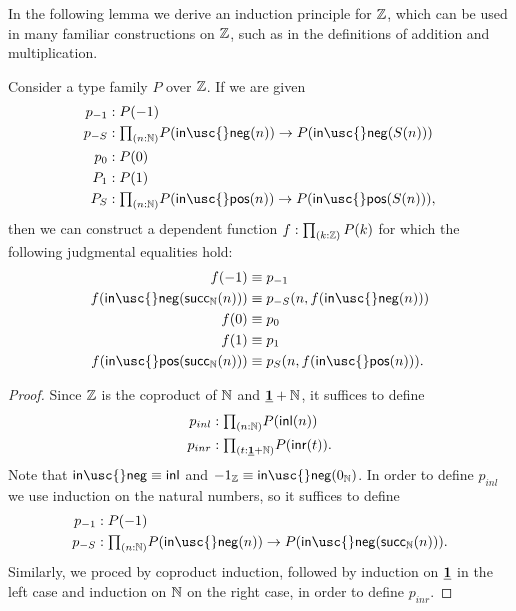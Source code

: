 In the following lemma we derive an induction principle for $\mathbb{Z}$, which can be used in many familiar constructions on $\mathbb{Z}$, such as in the definitions of addition and multiplication.

\begin{lem}\label{lem:Z_ind}
  Consider a type family $P$ over $\mathbb{Z}$. If we are given
  \begin{align*}
    p_{-1} & :P(-1) \\
    p_{-S} & : \prd{n:\N}P(\mathsf{in\usc{}neg}(n))\to P(\mathsf{in\usc{}neg}(S(n)))\\
    p_{0} & : P(0) \\
    P_{1} & : P(1) \\
    P_{S} & : \prd{n:\N}P(\mathsf{in\usc{}pos}(n))\to P(\mathsf{in\usc{}pos}(S(n))),
  \end{align*}
  then we can construct a dependent function $f:\prd{k:\Z}P(k)$ for which the following judgmental equalities hold:
  \begin{align*}
    f(-1) & \jdeq p_{-1} \\
    f(\mathsf{in\usc{}neg}(\mathsf{succ}_\N(n))) & \jdeq p_{-S}(n,f(\mathsf{in\usc{}neg}(n))) \\
    f(0) & \jdeq p_{0} \\
    f(1) & \jdeq p_{1} \\
    f(\mathsf{in\usc{}pos}(\mathsf{succ}_\N(n))) & \jdeq p_S(n,f(\mathsf{in\usc{}pos}(n))).
  \end{align*}
\end{lem}

\begin{proof}
  Since $\mathbb{Z}$ is the coproduct of $\mathbb{N}$ and $\underline{\mathbf{1}}+\mathbb{N}$, it suffices to define
  \begin{align*}
    p_{inl} & : \prd{n:\N}P(\inl(n)) \\
    p_{inr} & : \prd{t:\unit+\N}P(\inr(t)).
  \end{align*}
  Note that $\mathsf{in\usc{}neg}\jdeq\inl$ and $-1_\Z\jdeq \mathsf{in\usc{}neg}(\zeroN)$. In order to define $p_{inl}$ we use induction on the natural numbers, so it suffices to define
  \begin{align*}
    p_{-1} & : P(-1) \\
    p_{-S} & : \prd{n:\N} P(\mathsf{in\usc{}neg}(n))\to P(\mathsf{in\usc{}neg}(\succN(n))).
  \end{align*}
  Similarly, we proced by coproduct induction, followed by induction on $\underline{\mathbf{1}}$ in the left case and induction on $\mathbb{N}$ on the right case, in order to define $p_{inr}$. 
\end{proof}

